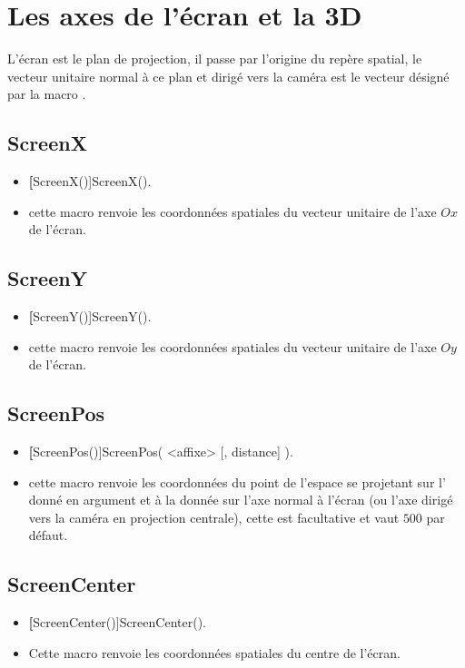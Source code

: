 \section{Les axes de l'écran et la 3D}

L'écran est le plan de projection, il passe par l'origine du repère spatial, le vecteur unitaire normal à ce plan et dirigé vers la caméra est le vecteur désigné par la macro .

\subsection{ScreenX}
\begin{itemize}
 \item \util \textbf[ScreenX()]{ScreenX()}.
 \item \desc cette macro renvoie les coordonnées spatiales du vecteur unitaire de l'axe $Ox$ de l'écran.
\end{itemize}


\subsection{ScreenY}
\begin{itemize}
 \item \util \textbf[ScreenY()]{ScreenY()}.
 \item \desc cette macro renvoie les coordonnées spatiales du vecteur unitaire de l'axe $Oy$ de l'écran.
\end{itemize}


\subsection{ScreenPos}
\begin{itemize}
 \item \util \textbf[ScreenPos()]{ScreenPos( <affixe> [, distance] )}.
 \item \desc cette macro renvoie les coordonnées du point de l'espace se projetant sur l' donné en argument et à la  donnée sur l'axe normal à l'écran (ou l'axe dirigé vers la caméra en projection centrale), cette  est facultative et vaut $500$ par défaut.
\end{itemize}


\subsection{ScreenCenter}
\begin{itemize}
 \item \util \textbf[ScreenCenter()]{ScreenCenter()}.
 \item \desc Cette macro renvoie les coordonnées spatiales du centre de l'écran.
\end{itemize}



